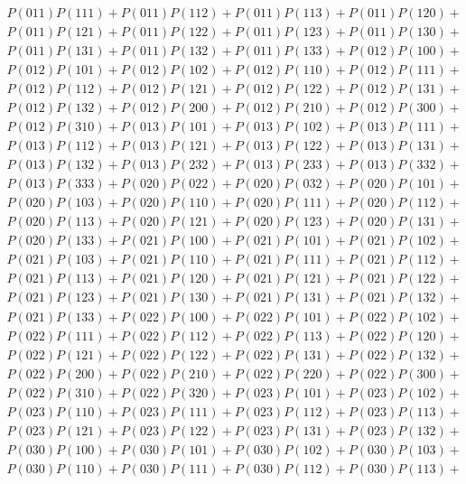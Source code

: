 \documentclass{article}
\theoremstyle{definition}
\begin{document}
\begin{gather*}
    P(011)P(111) + P(011)P(112) + P(011)P(113) + P(011)P(120) + \\
    P(011)P(121) + P(011)P(122) + P(011)P(123) + P(011)P(130) + \\
    P(011)P(131) + P(011)P(132) + P(011)P(133) + P(012)P(100) + \\
    P(012)P(101) + P(012)P(102) + P(012)P(110) + P(012)P(111) + \\
    P(012)P(112) + P(012)P(121) + P(012)P(122) + P(012)P(131) + \\
    P(012)P(132) + P(012)P(200) + P(012)P(210) + P(012)P(300) + \\
    P(012)P(310) + P(013)P(101) + P(013)P(102) + P(013)P(111) + \\
    P(013)P(112) + P(013)P(121) + P(013)P(122) + P(013)P(131) + \\
    P(013)P(132) + P(013)P(232) + P(013)P(233) + P(013)P(332) + \\
    P(013)P(333) + P(020)P(022) + P(020)P(032) + P(020)P(101) + \\
    P(020)P(103) + P(020)P(110) + P(020)P(111) + P(020)P(112) + \\
    P(020)P(113) + P(020)P(121) + P(020)P(123) + P(020)P(131) + \\
    P(020)P(133) + P(021)P(100) + P(021)P(101) + P(021)P(102) + \\
    P(021)P(103) + P(021)P(110) + P(021)P(111) + P(021)P(112) + \\
    P(021)P(113) + P(021)P(120) + P(021)P(121) + P(021)P(122) + \\
    P(021)P(123) + P(021)P(130) + P(021)P(131) + P(021)P(132) + \\
    P(021)P(133) + P(022)P(100) + P(022)P(101) + P(022)P(102) + \\
    P(022)P(111) + P(022)P(112) + P(022)P(113) + P(022)P(120) + \\
    P(022)P(121) + P(022)P(122) + P(022)P(131) + P(022)P(132) + \\
    P(022)P(200) + P(022)P(210) + P(022)P(220) + P(022)P(300) + \\
    P(022)P(310) + P(022)P(320) + P(023)P(101) + P(023)P(102) + \\
    P(023)P(110) + P(023)P(111) + P(023)P(112) + P(023)P(113) + \\
    P(023)P(121) + P(023)P(122) + P(023)P(131) + P(023)P(132) + \\
    P(030)P(100) + P(030)P(101) + P(030)P(102) + P(030)P(103) + \\
    P(030)P(110) + P(030)P(111) + P(030)P(112) + P(030)P(113) + \\

\end{gather*}
\end{document}
